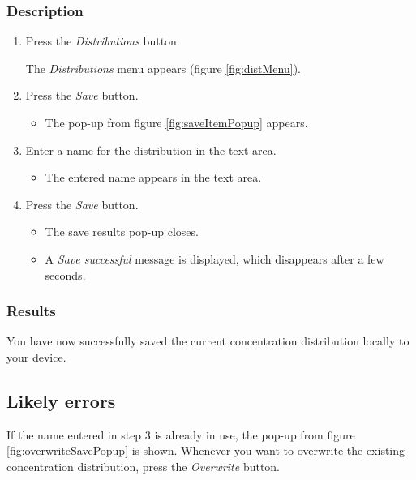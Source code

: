 \subsubsection{Description}
\begin{enumerate}
	\item Press the \emph{Distributions} button.
		\begin{itemize}
			The \emph{Distributions} menu appears (figure \ref{fig:distMenu}).
		\end{itemize}
	\item Press the \emph{Save} button.
		\begin{itemize}
			\item The pop-up from figure \ref{fig:saveItemPopup} appears.
		\end{itemize}
	\item Enter a name for the distribution in the text area.
		\begin{itemize}
			\item The entered name appears in the text area.
		\end{itemize}
	\item Press the \emph{Save} button.
		\begin{itemize}
			\item The save results pop-up closes.
			\item A \emph{Save successful} message is displayed, which disappears after a few seconds.
		\end{itemize}
\end{enumerate}

\subsubsection{Results}
You have now successfully saved the current concentration distribution locally to your device.

\subsection{Likely errors}
If the name entered in step 3 is already in use, the pop-up from figure \ref{fig:overwriteSavePopup} is shown. Whenever you want to overwrite the existing concentration distribution, press the \emph{Overwrite} button.

